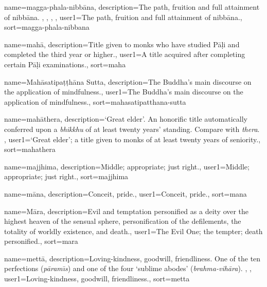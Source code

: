 {
name=magga-phala-nibb\=ana,
description={The path, fruition and full attainment of nibb\=ana. \protect \seepre %
\protect {}, \protect {}, \protect {}, \protect {}%
\protect \seepost %
},
user1={The path, fruition and full attainment of nibb\=ana.},
sort={magga-phala-nibbana}
}

{
name=mah\=a,
description={Title given to monks who have studied P\=a\d{l}i and completed the third year or higher.},
user1={A title acquired after completing certain P\=a\d{l}i examinations.},
sort={maha}
}

{
name={Mah\=asatipa\d{t}\d{t}h\=ana Sutta},
description={The Buddha's main discourse on the application of mindfulness.},
user1={The Buddha's main discourse on the application of mindfulness.},
sort={mahasatipatthana-sutta}
}

{
name={mah\=athera},
description={`Great elder'. An honorific title automatically conferred upon a \textit{bhikkhu} of at least twenty years' standing. Compare with \textit{thera}. \protect \seepre %
\protect {}%
\protect \seepost %
},
user1={`Great elder'; a title given to monks of at least twenty years of seniority.},
sort={mahathera}
}

{
name={majjhima},
description={Middle; appropriate; just right.},
user1={Middle; appropriate; just right.},
sort={majjhima}
}

{
name=m\=ana,
description={Conceit, pride.},
user1={Conceit, pride.},
sort={mana}
}

{
name=M\=ara,
description={Evil and temptation personified as a deity over the highest heaven of the sensual sphere, personification of the defilements, the totality of worldly existence, and death.},
user1={The Evil One; the tempter; death personified.},
sort={mara}
}

{
name={mett\=a},
description={Loving-kindness, goodwill, friendliness. One of the ten perfections (\textit{p\=aram\={\i}s}) and one of the four `sublime abodes' (\textit{brahma-vih\=ara}). \protect \seepre %
\protect {}, \protect {}%
\protect \seepost %
},
user1={Loving-kindness, goodwill, friendliness.},
sort={metta}
}

